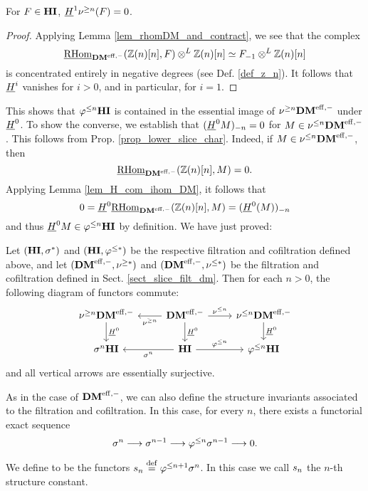 \begin{lem}\label{lem_H1_sgDM_vanishes}
For $F \in \HI$, $\sheaf{H}^1 \sgDM{n}(F) = 0$.
\end{lem}
\begin{proof}
Applying Lemma \ref{lem_rhomDM_and_contract}, we see that the
complex
\[
\ihomDMf(\Z(n)[n], F) \tDM \Z(n)[n] \simeq \RHI{F} \tDM \Z(n)[n]
\] 
is concentrated entirely in negative degrees (see Def. \ref{def_z_n}).
It follows that $\sheaf{H}^i$ vanishes for $i > 0$, and in particular,
for $i = 1$.
\end{proof}

This shows that $\tlHI{n}\HI$ is contained in the essential image 
of $\sgDM{n}\DMeff$ under $\sheaf{H}^0$. To show the converse, we 
establish that $\RHI[n]{(\sheaf{H}^0 M)} = 0$ for $M \in 
\slDM{n}\DMeff$. This follows from Prop. 
\ref{prop_lower_slice_char}. Indeed, if $M \in \slDM{n}\DMeff$, 
then 
\[
\ihomDMf(\Z(n)[n], M) = 0.
\] 
Applying Lemma \ref{lem_H_com_ihom_DM}, it follows that
\[
0 = \sheaf{H}^0\ihomDMf(\Z(n)[n], M) = \RHI[n]{(\sheaf{H}^0(M))}
\]
and thus $\sheaf{H}^0 M \in \tlHI{n}\HI$ by definition. We
have just proved:

\begin{prop}\label{prop_H_commute_with_filt}
Let $(\HI, \sgHI{*})$ and $(\HI, \tlHI{*})$ be the respective 
filtration and cofiltration defined above, and let $(\DMeff, 
\sgDM{*})$ and $(\DMeff, \slDM{*})$ be the filtration and
cofiltration defined in Sect. \ref{sect_slice_filt_dm}. Then
for each $n > 0$, the following diagram of functors commute:
\[
\begin{tikzcd}
\sgDM{n}\DMeff \arrow{d}{\sheaf{H}^0} &
\DMeff \arrow{l}{\sgDM{n}} \arrow{r}{\slDM{n}} \arrow{d}{\sheaf{H}^0} &
\slDM{n}\DMeff \arrow{d}{\sheaf{H}^0} \\
\sgHI{n}\HI &
\HI \arrow{l}{\sgHI{n}} \arrow{r}{\tlHI{n}} &
\tlHI{n}\HI 
\end{tikzcd}
\]
and all vertical arrows are essentially surjective.
\end{prop}

As in the case of $\DMeff$, we can also define the structure 
invariants associated to the filtration and cofiltration. In this
case, for every $n$, there exists a functorial exact sequence
\[
\sgHI{n} \to \sgHI{n - 1} \to \tlHI{n}\sgHI{n - 1} \to 0.
\]
\begin{defn}
We define  to be the 
functors $\slice{n} \defeq \tlHI{n + 1}\sgHI{n}$. In this case we 
call $\slice{n}$ the $n$-th structure constant.
\end{defn}

